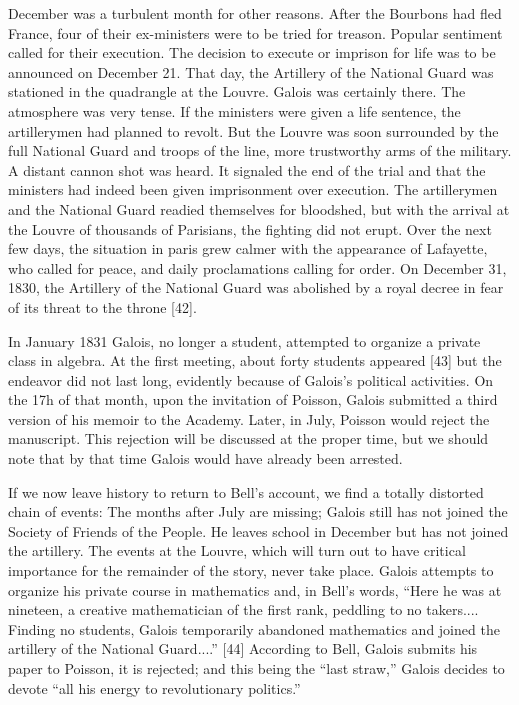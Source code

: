\documentclass[12pt]{article}
\begin{document}
December was a turbulent month for other reasons. After the Bourbons had fled France, four of their ex-ministers were to be tried for treason. Popular sentiment called for their execution. The decision to execute or imprison for life was to be announced on December 21. That day, the Artillery of the National Guard was stationed in the quadrangle at the Louvre. Galois was certainly there. The atmosphere was very tense. If the ministers were given a life sentence, the artillerymen had planned to revolt. But the Louvre was soon surrounded by the full National Guard and troops of the line, more trustworthy arms of the military. A distant cannon shot was heard. It signaled the end of the trial and that the ministers had indeed been given imprisonment over execution. The artillerymen and the National Guard readied themselves for bloodshed, but with the arrival at the Louvre of thousands of Parisians, the fighting did not erupt. Over the next few days, the situation in paris grew calmer with the appearance of Lafayette, who called for peace, and daily proclamations calling for order. On December 31, 1830, the Artillery of the National Guard was abolished by a royal decree in fear of its threat to the throne [42].

In January 1831 Galois, no longer a student, attempted to organize a private class in algebra. At the first meeting, about forty students appeared [43] but the endeavor did not last long, evidently because of Galois's political activities. On the 17h of that month, upon the invitation of Poisson, Galois submitted a third version of his memoir to the Academy. Later, in July, Poisson would reject the manuscript. This rejection will be discussed at the proper time, but we should note that by that time Galois would have already been arrested.

If we now leave history to return to Bell's account, we find a totally distorted chain of events: The months after July are missing; Galois still has not joined the Society of Friends of the People. He leaves school in December but has not joined the artillery. The events at the Louvre, which will turn out to have critical importance for the remainder of the story, never take place. Galois attempts to organize his private course in mathematics and, in Bell's words, ``Here he was at nineteen, a creative mathematician of the first rank, peddling to no takers.... Finding no students, Galois temporarily abandoned mathematics and joined the artillery of the National Guard....'' [44] According to Bell, Galois submits his paper to Poisson, it is rejected; and this being the ``last straw,'' Galois decides to devote ``all his energy to revolutionary politics.''
\end{document}
